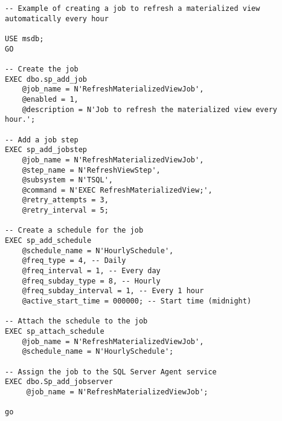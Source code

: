          \begin{lstlisting}[style=sqlstyle]
-- Example of creating a job to refresh a materialized view automatically every hour

USE msdb;
GO

-- Create the job
EXEC dbo.sp_add_job
    @job_name = N'RefreshMaterializedViewJob',
    @enabled = 1,
    @description = N'Job to refresh the materialized view every hour.';

-- Add a job step
EXEC sp_add_jobstep
    @job_name = N'RefreshMaterializedViewJob',
    @step_name = N'RefreshViewStep',
    @subsystem = N'TSQL',
    @command = N'EXEC RefreshMaterializedView;',
    @retry_attempts = 3,
    @retry_interval = 5;

-- Create a schedule for the job
EXEC sp_add_schedule
    @schedule_name = N'HourlySchedule',
    @freq_type = 4, -- Daily
    @freq_interval = 1, -- Every day
    @freq_subday_type = 8, -- Hourly
    @freq_subday_interval = 1, -- Every 1 hour
    @active_start_time = 000000; -- Start time (midnight)

-- Attach the schedule to the job
EXEC sp_attach_schedule
    @job_name = N'RefreshMaterializedViewJob',
    @schedule_name = N'HourlySchedule';

-- Assign the job to the SQL Server Agent service
EXEC dbo.Sp_add_jobserver
     @job_name = N'RefreshMaterializedViewJob';

go 

        \end{lstlisting}